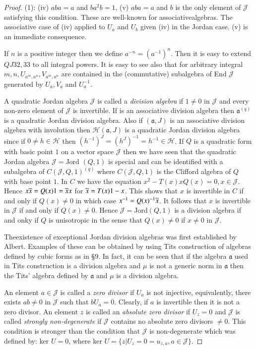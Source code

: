 \begin{proof}
(1): (iv) $aba=a$ and $ba^{2}b=1$, (v) $aba=a$ and $b$ is the only
element of $\mathscr{J}$ satisfying this condition. These are
well-known for associative\pageoriginale algebras. The associative
case of (iv) applied to $U_a$ and $U_b$ given (iv) in the Jordan
case. (v) is an immediate consequence.

If $n$ is a positive integer then we define
$a^{-n}=(a^{-1})^{n}$. Then it is easy to extend $QJ 32, 33$ to all
integral powers. It is easy to see also that for arbitrary integral
$m,n, U_{a^{m},a^{n}},V_{a^{m},a^{n}}$ are contained in the
(commutative) subalgebra of End $\mathscr{J}$ generated by $U_a,V_a$
and $U^{-1}_a$.

A quadratic Jordan algebra $\mathscr{J}$ is called a {\em division
  algebra} if $1\neq 0$ in $\mathscr{J}$ and every non-zero element of
$\mathscr{J}$ is invertible. If is an associative division algebra
then $\mathfrak{a}^{(q)}$ is a quadratic Jordan division algebra. Also
if $(\mathfrak{a},J)$ is an associative division algebra with
involution then $\mathscr{H}(\mathfrak{a},J)$ is a quadratic Jordan
division algebra since if $0\neq h \in \mathscr{H}$ then
$(h^{-1})^{J}=(h^{J})^{-1}=h^{-1}\in \mathscr{H}$. If $Q$ is a
quadratic form with basic point $1$ on a vector space $\mathscr{J}$
then we have seen that the quadratic Jordan algebra $\mathscr{J}=$Jord
$(Q,1)$ is special and can be identified with a subalgebra of
$C(\mathscr{J},Q,1)^{(q)}$ where $C(\mathscr{J},Q,1)$ is the Clifford
algebra of $Q$ with base point $1$. In $C$ we have the equation
$x^{2}-T(x)xQ(x)=0, x\in \mathscr{J}$. Hence
$x\overline{x}=Q(x)1=\overline{x}x$ for $\overline{x}=T(x)1-x$. This shows that $x$ is
invertible in $C$ if and only if $Q(x)\neq 0$ in which case
$x^{-1}=Q(x)^{-1}\overline{x}$. It follows that $x$ is invertible in
$\mathscr{J}$ if and only if $Q(x)\neq 0$. Hence
$\mathscr{J}=$Jord$(Q,1)$ is a division algebra if and onky if $Q$ is
unisotropic in the sense that $Q(x)\neq 0$ if $x\neq 0$ in
$\mathscr{J}$. 

The\pageoriginale existence of exceptional Jordan
division algebras was first established by Albert. Examples of these
can be obtained by using Tits construction of algebras defined by
cubic forms as in \S $9$. In fact, it can be seen that if the algebra
$\mathfrak{a}$ used in Tits construction is a division algebra and
$\mu$ is not a generic norm in $\mathfrak{a}$ then the Tits' algebra
defined by $\mathfrak{a}$ and $\mu$ is a division algebra.

An element $a\in \mathscr{J}$ is called a {\em zero divisor} if
$U_a$ is not injective, equivalently, there exists $ab\neq 0$ in
$\mathscr{J}$ such that $bU_a=0$. Clearly, if $a$ is invertible then
it is not a zero divisor. An element $z$ is called an {\em absolute
  zero divisor} if $U_z=0$ and $\mathscr{J}$ is called {\em strongly
  non-degenerate} if $\mathscr{J}$ contains no absolute zero divisors
$\neq 0$. This condition is stronger than the condition that
$\mathscr{J}$ is non-degenerate which was defined by: ker $U=0$, where
ker $U=\{z|U_z=0=u_{z,a},a\in \mathscr{J}\}$.


\end{proof}
